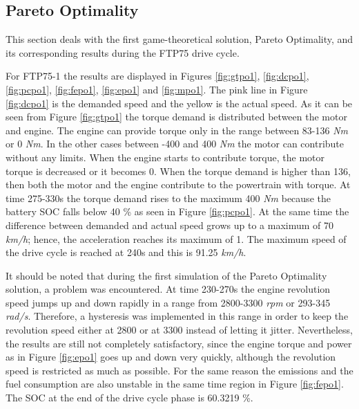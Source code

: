 \subsection{Pareto Optimality}
This section deals with the first game-theoretical solution, Pareto Optimality, and its corresponding results during the FTP75 drive cycle. 

For FTP75-1 the results are displayed in Figures \ref{fig:gtpo1}, \ref{fig:dcpo1}, \ref{fig:pcpo1}, \ref{fig:fepo1}, \ref{fig:epo1} and \ref{fig:mpo1}. The pink line in Figure \ref{fig:dcpo1} is the demanded speed and the yellow is the actual speed. As it can be seen from Figure \ref{fig:gtpo1} the torque demand is distributed between the motor and engine. The engine can provide torque only in the range between 83-136 \textit{Nm} or 0 \textit{Nm}. In the other cases between -400 and 400 \textit{Nm} the motor can contribute without any limits. When the engine starts to contribute torque, the motor torque is decreased or it becomes 0. When the torque demand is higher than 136, then both the motor and the engine contribute to the powertrain with torque. At time 275-330s the torque demand rises to the maximum 400 \textit{Nm} because the battery SOC falls below 40 \% as seen in Figure \ref{fig:pcpo1}. At the same time the difference between demanded and actual speed grows up to a maximum of 70 \textit{km/h}; hence, the acceleration reaches its maximum of 1. The maximum speed of the drive cycle is reached at 240s and this is 91.25 \textit{km/h}. 

It should be noted that during the first simulation of the Pareto Optimality solution, a problem was encountered. At time 230-270s the engine revolution speed jumps up and down rapidly in a range from 2800-3300 \textit{rpm} or 293-345 \textit{rad/s}. Therefore, a hysteresis was implemented in this range in order to keep the revolution speed either at 2800 or at 3300 instead of letting it jitter. Nevertheless, the results are still not completely satisfactory, since the engine torque and power as in Figure \ref{fig:epo1} goes up and down very quickly, although the revolution speed is restricted as much as possible. For the same reason the emissions and the fuel consumption are also unstable in the same time region in Figure \ref{fig:fepo1}. The SOC at the end of the drive cycle phase is 60.3219 \%.

